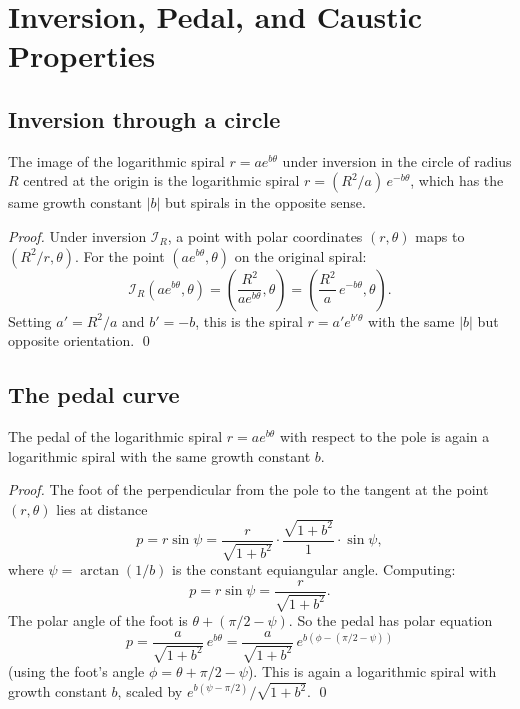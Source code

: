 
\section{Inversion, Pedal, and Caustic Properties}
\label{sec:17-inversion}

\subsection{Inversion through a circle}
\label{subsec:17-inversion}

\begin{proposition}
\label{prop:inversion}
The image of the logarithmic spiral \(r = ae^{b\theta}\) under
inversion in the circle of radius \(R\) centred at the origin is
the logarithmic spiral \(r = (R^2/a)\,e^{-b\theta}\), which has
the same growth constant \(|b|\) but spirals in the opposite
sense.
\end{proposition}

\begin{proof}
Under inversion \(\mathcal{I}_R\), a point with polar coordinates
\((r,\theta)\) maps to \((R^2/r, \theta)\).  For the point
\((ae^{b\theta}, \theta)\) on the original spiral:
\[
  \mathcal{I}_R(ae^{b\theta}, \theta) = \left(\frac{R^2}{ae^{b\theta}}, \theta\right)
  = \left(\frac{R^2}{a}\,e^{-b\theta}, \theta\right).
\]
Setting \(a' = R^2/a\) and \(b' = -b\), this is the spiral
\(r = a' e^{b'\theta}\) with the same \(|b|\) but opposite
orientation.
\qed
\end{proof}

\subsection{The pedal curve}
\label{subsec:17-pedal}

\begin{proposition}
\label{prop:pedal}
The pedal of the logarithmic spiral \(r = ae^{b\theta}\) with
respect to the pole is again a logarithmic spiral with the same
growth constant \(b\).
\end{proposition}

\begin{proof}
The foot of the perpendicular from the pole to the tangent at
the point \((r,\theta)\) lies at distance
\[
  p = r\sin\psi = \frac{r}{\sqrt{1+b^2}} \cdot \frac{\sqrt{1+b^2}}{1} \cdot \sin\psi,
\]
where \(\psi = \arctan(1/b)\) is the constant equiangular
angle.  Computing:
\[
  p = r\sin\psi = \frac{r}{\sqrt{1+b^2}}.
\]
The polar angle of the foot is \(\theta + (\pi/2 - \psi)\).
So the pedal has polar equation
\[
  p = \frac{a}{\sqrt{1+b^2}}\,e^{b\theta}
  = \frac{a}{\sqrt{1+b^2}}\,e^{b(\phi - (\pi/2-\psi))}
\]
(using the foot's angle \(\phi = \theta + \pi/2 - \psi\)).
This is again a logarithmic spiral with growth constant \(b\),
scaled by \(e^{b(\psi-\pi/2)}/\sqrt{1+b^2}\).
\qed
\end{proof}

